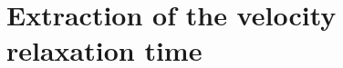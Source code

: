 \documentclass[11pt]{article}
\begin{document}

\clearpage
\appendix
\section{Extraction of the velocity relaxation time}
\label{app:invtau}
\end{document}
